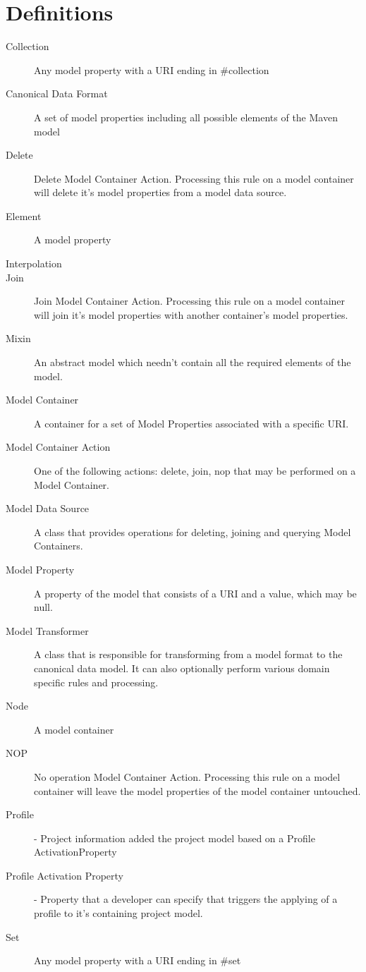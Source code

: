 \documentclass[12pt]{amsart}
\begin{document}
\section{Definitions}
\begin{description}
\item[Collection] Any model property with a URI ending in \#collection
\item[Canonical Data Format] A set of model properties including all possible elements of the Maven model
\item[Delete] Delete Model Container Action. Processing this rule on a model container will delete it's model properties from a model data source.
\item[Element] A model property
\item[Interpolation] 
\item[Join] Join Model Container Action. Processing this rule on a model container will join it's model properties with another container's model properties.
\item[Mixin]  An abstract model which needn't contain all the required elements of the model.
\item[Model Container]  A container for a set of Model Properties associated with a specific URI.
\item[Model Container Action]  One of the following actions: delete, join, nop that may be performed on a  Model Container.
\item[Model Data Source] A class that provides operations for deleting, joining and querying Model Containers.
\item[Model Property]  A property of the model that consists of a URI and a value, which may be null.
\item[Model Transformer]  A class that is responsible for transforming from a model format to the 
canonical data model. It can also optionally perform various domain specific rules and processing.
\item[Node] A model container
\item[NOP] No operation Model Container Action. Processing this rule on a model container will leave the model properties of the model container untouched.
\item[Profile]  - Project information added the project model based on a Profile ActivationProperty
\item[Profile Activation Property]  - Property that a developer can specify that triggers the applying of a profile to it's containing project model.
\item[Set] Any model property with a URI ending in \#set
\end{description}
\end{document}

